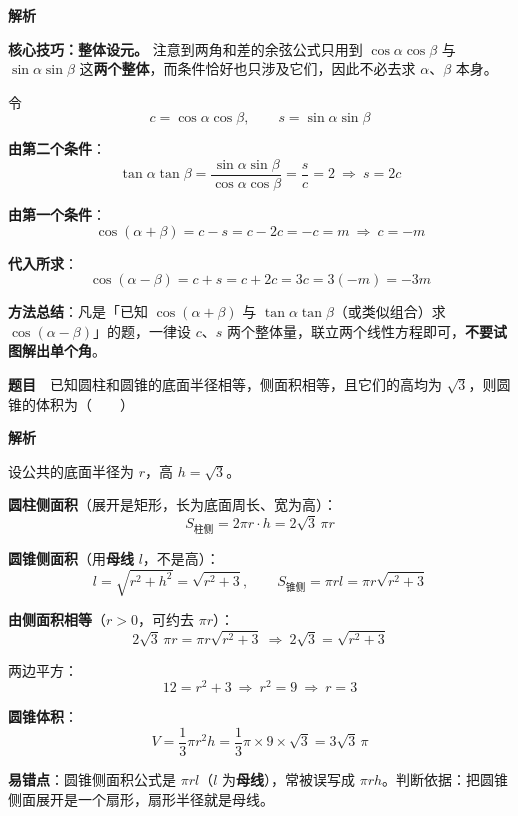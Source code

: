 \textbf{解析}

\textbf{核心技巧：整体设元。} 注意到两角和差的余弦公式只用到 $\cos\alpha\cos\beta$ 与 $\sin\alpha\sin\beta$ 这\textbf{两个整体}，而条件恰好也只涉及它们，因此不必去求 $\alpha$、$\beta$ 本身。

令
\[c=\cos\alpha\cos\beta,\qquad s=\sin\alpha\sin\beta\]

\textbf{由第二个条件}：
\[\tan\alpha\tan\beta=\frac{\sin\alpha\sin\beta}{\cos\alpha\cos\beta}=\frac sc=2\ \Longrightarrow\ s=2c\]

\textbf{由第一个条件}：
\[\cos(\alpha+\beta)=c-s=c-2c=-c=m\ \Longrightarrow\ c=-m\]

\textbf{代入所求}：
\[\cos(\alpha-\beta)=c+s=c+2c=3c=3(-m)=-3m\]


\begin{gktip}
\textbf{方法总结}：凡是「已知 $\cos(\alpha+\beta)$ 与 $\tan\alpha\tan\beta$（或类似组合）求 $\cos(\alpha-\beta)$」的题，一律设 $c$、$s$ 两个整体量，联立两个线性方程即可，\textbf{不要试图解出单个角}。
\end{gktip}

\par\medskip


\textbf{题目}　已知圆柱和圆锥的底面半径相等，侧面积相等，且它们的高均为 $\sqrt3$，则圆锥的体积为（　　）

\textbf{解析}

设公共的底面半径为 $r$，高 $h=\sqrt3$。

\textbf{圆柱侧面积}（展开是矩形，长为底面周长、宽为高）：
\[S_{\text{柱侧}}=2\pi r\cdot h=2\sqrt3\,\pi r\]

\textbf{圆锥侧面积}（用\textbf{母线} $l$，不是高）：
\[l=\sqrt{r^{2}+h^{2}}=\sqrt{r^{2}+3},\qquad S_{\text{锥侧}}=\pi r l=\pi r\sqrt{r^{2}+3}\]

\textbf{由侧面积相等}（$r>0$，可约去 $\pi r$）：
\[2\sqrt3\,\pi r=\pi r\sqrt{r^{2}+3}\ \Longrightarrow\ 2\sqrt3=\sqrt{r^{2}+3}\]

两边平方：
\[12=r^{2}+3\ \Longrightarrow\ r^{2}=9\ \Longrightarrow\ r=3\]

\textbf{圆锥体积}：
\[V=\frac13\pi r^{2}h=\frac13\pi\times9\times\sqrt3=3\sqrt3\,\pi\]


\begin{gktip}
\textbf{易错点}：圆锥侧面积公式是 $\pi rl$（$l$ 为\textbf{母线}），常被误写成 $\pi rh$。判断依据：把圆锥侧面展开是一个扇形，扇形半径就是母线。
\end{gktip}

